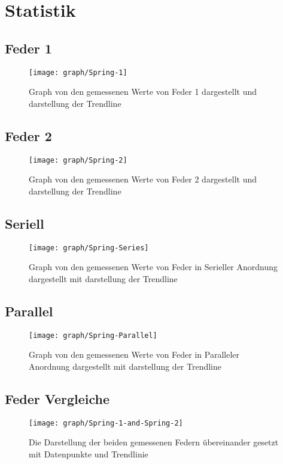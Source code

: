 \documentclass[../main.tex]{subfiles} %
\begin{document}
\section{Statistik}\label{sec:statistik}
\subsection{Feder 1}\label{subsec:statik-feder-1}
\begin{figure}[H]
    \centering
    \texttt{[image: graph/Spring-1]}
    \caption{Graph von den gemessenen Werte von Feder 1 dargestellt und darstellung der Trendline}
    \label{fig:graph-spring-1}
\end{figure}
\subsection{Feder 2}\label{subsec:statik-feder-2}
\begin{figure}[H]
    \centering
    \texttt{[image: graph/Spring-2]}
    \caption{Graph von den gemessenen Werte von Feder 2 dargestellt und darstellung der Trendline}
    \label{fig:graph-spring-2}
\end{figure}
\subsection{Seriell}\label{subsec:statik-spring-series}
\begin{figure}[H]
    \centering
    \texttt{[image: graph/Spring-Series]}
    \caption{Graph von den gemessenen Werte von Feder in Serieller Anordnung dargestellt mit darstellung der Trendline}
    \label{fig:graph-spring-series}
\end{figure}
\subsection{Parallel}\label{subsec:statik-spring-parallel}
\begin{figure}[H]
    \centering
    \texttt{[image: graph/Spring-Parallel]}
    \caption{Graph von den gemessenen Werte von Feder in Paralleler Anordnung dargestellt mit darstellung der Trendline}
    \label{fig:graph-spring-parallel}
\end{figure}
\subsection{Feder Vergleiche}\label{subsec:statik-spring-comparisons}
\begin{figure}[H]
    \centering
    \texttt{[image: graph/Spring-1-and-Spring-2]}
    \caption{Die Darstellung der beiden gemessenen Federn übereinander gesetzt mit Datenpunkte und Trendlinie}
    \label{fig:graph-single-spring-comparisons}
\end{figure}
\end{document}
